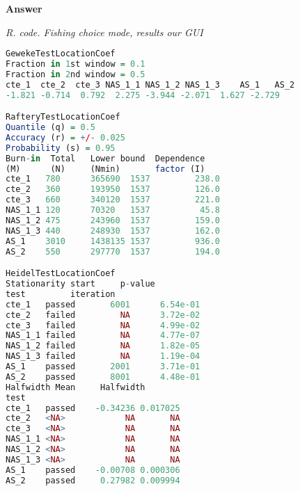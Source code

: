 \begin{enumerate}[leftmargin=*]
\textbf{Answer}

\begin{tcolorbox}[enhanced,width=4.67in,center upper,
	fontupper=\large\bfseries,drop shadow southwest,sharp corners]
	\textit{R. code. Fishing choice mode, results our GUI}
	\begin{VF}
		\begin{lstlisting}[language=R]
GewekeTestLocationCoef
Fraction in 1st window = 0.1
Fraction in 2nd window = 0.5 
cte_1  cte_2  cte_3 NAS_1_1 NAS_1_2 NAS_1_3    AS_1   AS_2 
-1.821 -0.714  0.792  2.275 -3.944 -2.071  1.627 -2.729 

RafteryTestLocationCoef
Quantile (q) = 0.5
Accuracy (r) = +/- 0.025
Probability (s) = 0.95 
Burn-in  Total   Lower bound  Dependence
(M)      (N)     (Nmin)       factor (I)
cte_1   780      365690  1537         238.0     
cte_2   360      193950  1537         126.0     
cte_3   660      340120  1537         221.0     
NAS_1_1 120      70320   1537          45.8     
NAS_1_2 475      243960  1537         159.0     
NAS_1_3 440      248930  1537         162.0     
AS_1    3010     1438135 1537         936.0     
AS_2    550      297770  1537         194.0     

HeidelTestLocationCoef
Stationarity start     p-value 
test         iteration         
cte_1   passed       6001      6.54e-01
cte_2   failed         NA      3.72e-02
cte_3   failed         NA      4.99e-02
NAS_1_1 failed         NA      4.77e-07
NAS_1_2 failed         NA      1.82e-05
NAS_1_3 failed         NA      1.19e-04
AS_1    passed       2001      3.71e-01
AS_2    passed       8001      4.48e-01
Halfwidth Mean     Halfwidth
test                        
cte_1   passed    -0.34236 0.017025 
cte_2   <NA>            NA       NA 
cte_3   <NA>            NA       NA 
NAS_1_1 <NA>            NA       NA 
NAS_1_2 <NA>            NA       NA 
NAS_1_3 <NA>            NA       NA 
AS_1    passed    -0.00708 0.000306 
AS_2    passed     0.27982 0.009994 
\end{lstlisting}
	\end{VF}
\end{tcolorbox}


\end{enumerate}

